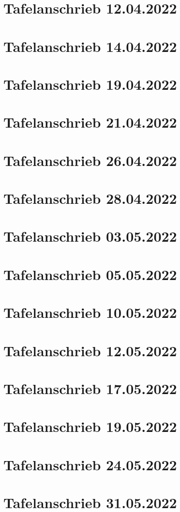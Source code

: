 \documentclass[a4paper,12pt]{article}
\begin{document}
\tableofcontents
\newpage
\section{Tafelanschrieb 12.04.2022}

\newpage
\section{Tafelanschrieb 14.04.2022}

\section{Tafelanschrieb 19.04.2022}

\section{Tafelanschrieb 21.04.2022}

\newpage
\section{Tafelanschrieb 26.04.2022}

\newpage
\section{Tafelanschrieb 28.04.2022}

\newpage
\section{Tafelanschrieb 03.05.2022}

\newpage
\section{Tafelanschrieb 05.05.2022}

\newpage
\section{Tafelanschrieb 10.05.2022}

\newpage
\section{Tafelanschrieb 12.05.2022}

\newpage
\section{Tafelanschrieb 17.05.2022}

\newpage
\section{Tafelanschrieb 19.05.2022}

\newpage
\section{Tafelanschrieb 24.05.2022}

\newpage
\section{Tafelanschrieb 31.05.2022}

\end{document}

